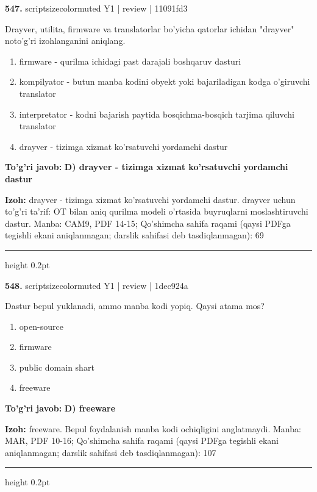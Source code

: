 \documentclass[10pt,a4paper]{article}
\begin{document}
{\bfseries\sffamily\color{ink} 547.} {scriptsizecolor{muted} Y1 | review | 11091fd3}
\par
Drayver, utilita, firmware va translatorlar bo'yicha qatorlar ichidan "drayver" noto'g'ri izohlanganini aniqlang.
\begin{enumerate}[label=\Alph*),leftmargin=9mm]
\item firmware - qurilma ichidagi past darajali boshqaruv dasturi
\item kompilyator - butun manba kodini obyekt yoki bajariladigan kodga o'giruvchi translator
\item interpretator - kodni bajarish paytida bosqichma-bosqich tarjima qiluvchi translator
\item drayver - tizimga xizmat ko'rsatuvchi yordamchi dastur
\end{enumerate}
\begin{tcolorbox}[enhanced,breakable,colback=teal!4,colframe=teal!60!black,boxrule=0.45pt,arc=1.2mm,left=2.7mm,right=2.7mm,top=1.8mm,bottom=1.8mm,before skip=2mm,after skip=2mm]
{\bfseries\sffamily\color{teal}To'g'ri javob:} \textbf{D) drayver - tizimga xizmat ko'rsatuvchi yordamchi dastur}
\par\smallskip
{\bfseries Izoh:} drayver - tizimga xizmat ko'rsatuvchi yordamchi dastur. drayver uchun to'g'ri ta'rif: OT bilan aniq qurilma modeli o'rtasida buyruqlarni moslashtiruvchi dastur. Manba: CAM9, PDF 14-15; Qo'shimcha sahifa raqami (qaysi PDFga tegishli ekani aniqlanmagan; darslik sahifasi deb tasdiqlanmagan): 69
\end{tcolorbox}
\vspace{2mm}\hrule height 0.2pt\vspace{3mm}

{\bfseries\sffamily\color{ink} 548.} {scriptsizecolor{muted} Y1 | review | 1dec924a}
\par
Dastur bepul yuklanadi, ammo manba kodi yopiq. Qaysi atama mos?
\begin{enumerate}[label=\Alph*),leftmargin=9mm]
\item open-source
\item firmware
\item public domain shart
\item freeware
\end{enumerate}
\begin{tcolorbox}[enhanced,breakable,colback=teal!4,colframe=teal!60!black,boxrule=0.45pt,arc=1.2mm,left=2.7mm,right=2.7mm,top=1.8mm,bottom=1.8mm,before skip=2mm,after skip=2mm]
{\bfseries\sffamily\color{teal}To'g'ri javob:} \textbf{D) freeware}
\par\smallskip
{\bfseries Izoh:} freeware. Bepul foydalanish manba kodi ochiqligini anglatmaydi. Manba: MAR, PDF 10-16; Qo'shimcha sahifa raqami (qaysi PDFga tegishli ekani aniqlanmagan; darslik sahifasi deb tasdiqlanmagan): 107
\end{tcolorbox}
\vspace{2mm}\hrule height 0.2pt\vspace{3mm}
\end{document}
